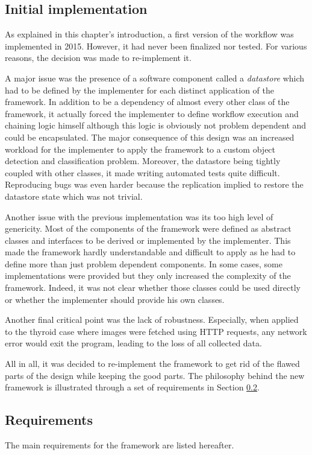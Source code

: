 \subsection{Initial implementation}
\label{ssec:work_init_impl}
As explained in this chapter's introduction, a first version of the workflow was implemented in 2015. However, it had never been finalized nor tested. For various reasons, the decision was made to re-implement it.

A major issue was the presence of a software component called a \textit{datastore} which had to be defined by the implementer for each distinct application of the framework. In addition to be a dependency of almost every other class of the framework, it actually forced the implementer to define workflow execution and chaining logic himself although this logic is obviously not problem dependent and could be encapsulated. The major consequence of this design was an increased workload for the implementer to apply the framework to a custom object detection and classification problem. Moreover, the datastore being tightly coupled with other classes, it made writing automated tests quite difficult. Reproducing bugs was even harder because the replication implied to restore the datastore state which was not trivial. 

Another issue with the previous implementation was its too high level of genericity. Most of the components of the framework were defined as abstract classes and interfaces to be derived or implemented by the implementer. This made the framework hardly understandable and difficult to apply as he had to define more than just problem dependent components. In some cases, some implementations were provided but they only increased the complexity of the framework. Indeed, it was not clear whether those classes could be used directly or whether the implementer should provide his own classes.

Another final critical point was the lack of robustness. Especially, when applied to the thyroid case where images were fetched using HTTP requests, any network error would exit the program, leading to the loss of all collected data.

All in all, it was decided to re-implement the framework to get rid of the flawed parts of the design while keeping the good parts. The philosophy behind the new framework is illustrated through a set of requirements in Section \ref{ssec:work_requirements}.

\subsection{Requirements}
\label{ssec:work_requirements}
The main requirements for the framework are listed hereafter.


